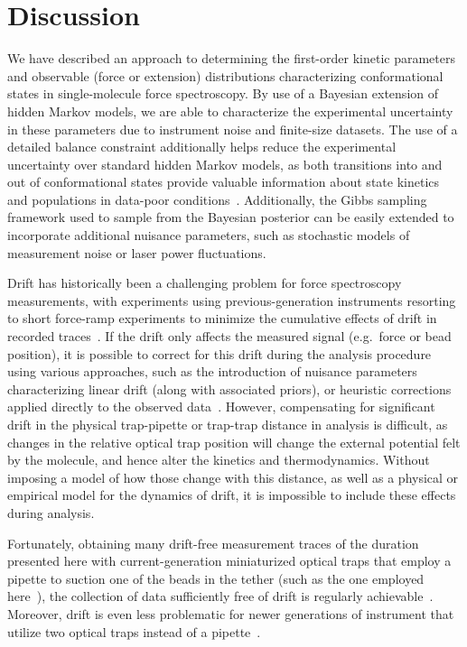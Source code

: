 \documentclass[aps,pre,twocolumn,superscriptaddress,nofootinbib,longbibliography]{revtex4-1}
\begin{document}
{\section{Discussion}
\label{section:discussion}

We have described an approach to determining the first-order kinetic parameters and observable (force or extension) distributions characterizing conformational states in single-molecule force spectroscopy.
By use of a Bayesian extension of hidden Markov models, we are able to characterize the experimental uncertainty in these parameters due to instrument noise and finite-size datasets.
The use of a detailed balance constraint additionally helps reduce the experimental uncertainty over standard hidden Markov models, as both transitions into and out of conformational states provide valuable information about state kinetics and populations in data-poor conditions~\cite{noe:jcp:2008:transition-matrix-sampling,metzner-noe-schuette:pre:2009:transition-matrix-sampling}.
Additionally, the Gibbs sampling framework used to sample from the Bayesian posterior can be easily extended to incorporate additional nuisance parameters, such as stochastic models of {\color{red}measurement noise} or laser power fluctuations.

\color{red}
Drift has historically been a challenging problem for force spectroscopy measurements, with experiments using previous-generation instruments resorting to short force-ramp experiments to minimize the cumulative effects of drift in recorded traces~\cite{collin:nature:2005:crooks-verification}.
If the drift only affects the measured signal (e.g.~force or bead position), it is possible to correct for this drift during the analysis procedure using various approaches, such as the introduction of nuisance parameters characterizing linear drift (along with associated priors), or heuristic corrections applied directly to the observed data~\cite{moghtaden:comp-stat-data-anal:2012:empirical-mode-decomposition}.
However, compensating for significant drift in the physical trap-pipette or trap-trap distance in analysis is difficult, as changes in the relative optical trap position will change the external potential felt by the molecule, and hence alter the kinetics and thermodynamics.
Without imposing a model of how those change with this distance, as well as a physical or empirical model for the dynamics of drift, it is impossible to include these effects during analysis.

Fortunately, obtaining many drift-free measurement traces of the duration presented here with current-generation miniaturized optical traps that employ a pipette to suction one of the beads in the tether (such as the one employed here~\cite{bustamante-smith:2006:minitweezers-patent}), the collection of data sufficiently free of drift is regularly achievable~\cite{bustamante:csh-protocols:2009:optical-tweezers}.
Moreover, drift is even less problematic for newer generations of instrument that utilize two optical traps instead of a pipette~\cite{block:nature:2003:dual-trap,bustamante:annu-rev-biochem:2008:optical-tweezers}.
\color{black}

}
\end{document}
